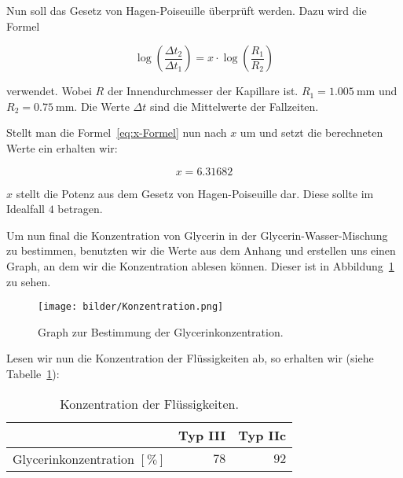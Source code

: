             Nun soll das Gesetz von Hagen-Poiseuille überprüft werden. Dazu wird die Formel

            \begin{equation}
                \log\left(\frac{\Delta t_{2}}{\Delta t_{1}}\right) = x \cdot \log\left(\frac{R_{1}}{R_{2}}\right)
                \label{eq:x-Formel}
            \end{equation}

            verwendet. Wobei $R$ der Innendurchmesser der Kapillare ist. $R_{1} = 1.005\ \mathrm{mm}$ und $R_{2} = 0.75\ \mathrm{mm}$. Die Werte $\Delta t$ sind die Mittelwerte der Fallzeiten.

            Stellt man die Formel~\ref{eq:x-Formel} nun nach $x$ um und setzt die berechneten Werte ein erhalten wir:

            $$x = 6.31682$$

            $x$ stellt die Potenz aus dem Gesetz von Hagen-Poiseuille dar. Diese sollte im Idealfall $4$ betragen.

            Um nun final die Konzentration von Glycerin in der Glycerin-Wasser-Mischung zu bestimmen, benutzten wir die Werte aus dem Anhang und erstellen uns einen Graph, an dem wir die Konzentration ablesen können. Dieser ist in Abbildung~\ref{fig:GraphKonzentration} zu sehen.

            \begin{figure}[H]
                \centering
                \texttt{[image: bilder/Konzentration.png]}
                \caption{Graph zur Bestimmung der Glycerinkonzentration.}
                \label{fig:GraphKonzentration}
            \end{figure}

            Lesen wir nun die Konzentration der Flüssigkeiten ab, so erhalten wir (siehe Tabelle~\ref{tab:Konzentration}):

            \begin{table}[H]
                \centering
                \caption{Konzentration der Flüssigkeiten.}
                \vspace*{.5em}
                \begin{tabular}{|l||r|r|}
                    \hline
                    & Typ III & Typ IIc\\
                    \hline\hline
                    Glycerinkonzentration $[\mathrm{\%}]$ & $78$ & $92$\\
                    \hline
                \end{tabular}
                \label{tab:Konzentration}
            \end{table}

